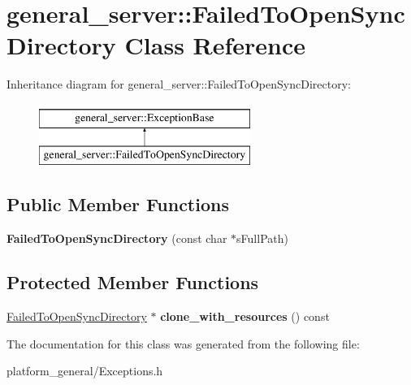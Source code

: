 \hypertarget{classgeneral__server_1_1FailedToOpenSyncDirectory}{\section{general\-\_\-server\-:\-:\-Failed\-To\-Open\-Sync\-Directory \-Class \-Reference}
\label{classgeneral__server_1_1FailedToOpenSyncDirectory}
}
\-Inheritance diagram for general\-\_\-server\-:\-:\-Failed\-To\-Open\-Sync\-Directory\-:\begin{figure}[H]
\begin{center}
\leavevmode
\includegraphics[height=2.000000cm]{classgeneral__server_1_1FailedToOpenSyncDirectory}
\end{center}
\end{figure}
\subsection*{\-Public \-Member \-Functions}
\begin{DoxyCompactItemize}
\item 
\hypertarget{classgeneral__server_1_1FailedToOpenSyncDirectory_a076f1ee5953f9171d62d2697b6e6713b}{{\bfseries \-Failed\-To\-Open\-Sync\-Directory} (const char $\ast$s\-Full\-Path)}\label{classgeneral__server_1_1FailedToOpenSyncDirectory_a076f1ee5953f9171d62d2697b6e6713b}

\end{DoxyCompactItemize}
\subsection*{\-Protected \-Member \-Functions}
\begin{DoxyCompactItemize}
\item 
\hypertarget{classgeneral__server_1_1FailedToOpenSyncDirectory_ae1b352a6a59e427cd0f2c804c8fdf7d0}{\hyperlink{classgeneral__server_1_1FailedToOpenSyncDirectory}{\-Failed\-To\-Open\-Sync\-Directory} $\ast$ {\bfseries clone\-\_\-with\-\_\-resources} () const }\label{classgeneral__server_1_1FailedToOpenSyncDirectory_ae1b352a6a59e427cd0f2c804c8fdf7d0}

\end{DoxyCompactItemize}


\-The documentation for this class was generated from the following file\-:\begin{DoxyCompactItemize}
\item 
platform\-\_\-general/\-Exceptions.\-h\end{DoxyCompactItemize}
